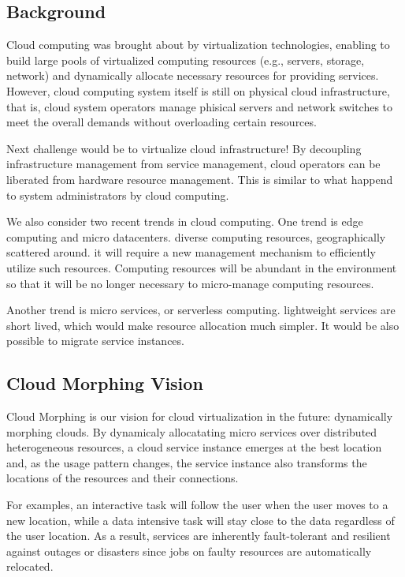 \subsection{Background}

Cloud computing was brought about by virtualization technologies,
enabling to build large pools of virtualized computing resources (e.g.,
servers, storage, network) and dynamically allocate necessary resources
for providing services.
However, cloud computing system itself is still on physical cloud
infrastructure, that is, cloud system operators manage phisical
servers and network switches to meet the overall demands without
overloading certain resources.

Next challenge would be to virtualize cloud infrastructure!
By decoupling infrastructure management from service management,
cloud operators can be liberated from hardware resource management.
This is similar to what happend to system administrators by cloud
computing.

We also consider two recent trends in cloud computing.
One trend is edge computing and micro datacenters.
diverse computing resources, geographically scattered around.
it will require a new management mechanism to efficiently utilize such
resources.
Computing resources will be abundant in the environment so that it
will be no longer necessary to micro-manage computing resources.

Another trend is micro services, or serverless computing.
lightweight services are short lived, which would make resource
allocation much simpler. It would be also possible to migrate service
instances. 


\subsection{Cloud Morphing Vision}

Cloud Morphing is our vision for cloud virtualization in the future:
dynamically morphing clouds.
By dynamicaly allocatating micro services over distributed
heterogeneous resources, a cloud service instance emerges at the best
location and, as the usage pattern changes, the service instance also
transforms the locations of the resources and their connections.

For examples, an interactive task will follow the user when the user 
moves to a new location, while a data intensive task will stay close
to the data regardless of the user location. As a result, services are
inherently fault-tolerant and resilient against outages or disasters
since jobs on faulty resources are automatically relocated.

